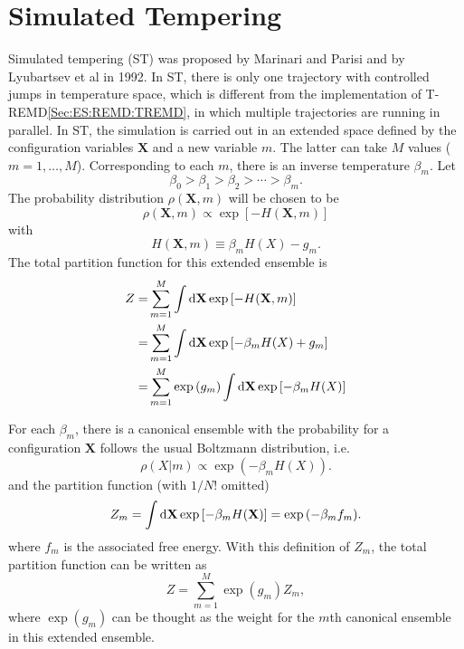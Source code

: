 \section{Simulated Tempering\label{Sec:ES:ST}}
Simulated tempering (ST) was proposed by Marinari and Parisi\cite{MarinariEPL1992} and by Lyubartsev et al\cite{LyubartsevJCP1992} in 1992. In ST, there is only one trajectory with controlled jumps in temperature space, which is different from the implementation of T-REMD\ref{Sec:ES:REMD:TREMD}, in which multiple trajectories are running in parallel. In ST, the simulation is carried out in an extended space defined by the configuration variables $\mathbf{X}$ and a new variable $m$. The latter can take $M$ values ($m=1,\dots,M$). Corresponding to each $m$, there is an inverse temperature $\beta_m$. Let
\begin{equation}
    \beta_0>\beta_1>\beta_2>\cdots >\beta_m.
\end{equation}
The probability distribution $\rho(\mathbf{X},m)$ will be chosen to be 
\begin{equation}
  \rho(\mathbf{X},m)\propto \exp{\left[-H(\mathbf{X},m)\right]}
\end{equation}
with 
\begin{equation}
  H(\mathbf{X},m)\equiv \beta_m H(X)-g_m.
\end{equation}
The total partition function for this extended ensemble is
\begin{align}
    Z=&\sum_{m=1}^M \int\mathop{}\!\mathrm{d} \mathbf{X} \exp{\left[-H(\mathbf{X},m)\right]}\notag\\
     =&\sum_{m=1}^M \int\mathop{}\!\mathrm{d} \mathbf{X} \exp{\left[-\beta_m H(X)+g_m\right]}\notag\\
     =&\sum_{m=1}^M \exp{(g_m)}\int\mathop{}\!\mathrm{d} \mathbf{X} \exp{\left[-\beta_m H(X)\right]}
\end{align}

For each $\beta_m$, there is a canonical ensemble with the probability for a configuration $\mathbf{X}$ follows the usual Boltzmann distribution, i.e. 
\begin{equation}
    \rho(X|m)\propto \exp{(-\beta_m H(X))}.
\end{equation}
and the partition function (with $1/N!$ omitted)
\begin{equation}
    Z_m=\int \mathop{}\!\mathrm{d} \mathbf{X} \exp{[-\beta_m H(\mathbf{X})]}=\exp{(-\beta_m f_m)}.
\end{equation}
where $f_m$ is the associated free energy. With this definition of $Z_m$, the total partition function can be written as
\begin{equation}
    Z=\sum_{m=1}^M \exp{(g_m)} Z_m,
\end{equation}
where $\exp{(g_m)}$ can be thought as the weight for the $m$th canonical ensemble in this extended ensemble.

